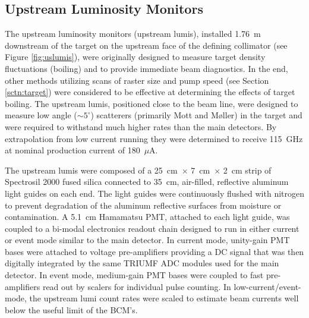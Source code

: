\subsection{Upstream Luminosity Monitors}
The upstream luminosity monitors (upstream lumis), installed 1.76~m downstream of the target on the upstream face of the defining collimator (see Figure \ref{fig:uslumis}), were originally designed to measure target density fluctuations (boiling) and to provide immediate beam diagnostics. In the end, other methods utilizing scans of raster size and pump speed (see Section \ref{sctn:target}) were considered to be effective at determining the effects of target boiling. The upstream lumis, positioned close to the beam line, were designed to measure low angle ($\sim 5^{\circ}$) scatterers (primarily Mott and M\o ller) in the target and were required to withstand much higher rates than the main detectors. By extrapolation from low current running they were determined to receive 115~GHz at nominal production current of 180~$\mu$A. 

The upstream lumis were composed of a 25~cm~$\times$ 7~cm~$\times$ 2~cm strip of Spectrosil 2000 fused silica connected to 35~cm, air-filled, reflective aluminum light guides on each end. The light guides were continuously flushed with nitrogen to prevent degradation of the aluminum reflective surfaces from moisture or contamination. A 5.1~cm Hamamatsu PMT, attached to each light guide, was coupled to a bi-modal electronics readout chain designed to run in either current or event mode similar to the main detector. In current mode, unity-gain PMT bases were attached to voltage pre-amplifiers providing a DC signal that was then digitally integrated by the same TRIUMF ADC modules used for the main detector. In event mode, medium-gain PMT bases were coupled to fast pre-amplifiers read out by scalers for individual pulse counting. In low-current/event-mode, the upstream lumi count rates were scaled to estimate beam currents well below the useful limit of the BCM's. 

